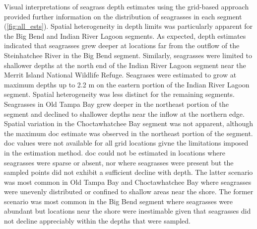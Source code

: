 \documentclass[letterpaper,12pt,oneside]{article}\usepackage[]{graphicx}\usepackage[]{color}
\begin{document}
Visual interpretations of seagrass depth estimates using the grid-based approach provided further information on the distribution of seagrasses in each segment (\cref{fig:all_ests}).  Spatial heterogeneity in depth limits was particularly apparent for the Big Bend and Indian River Lagoon segments.  As expected, depth estimates indicated that seagrasses grew deeper at locations far from the outflow of the Steinhatchee River in the Big Bend segment.  Similarly, seagrasses were limited to shallower depths at the north end of the Indian River Lagoon segment near the Merrit Island National Wildlife Refuge. Seagrases were estimated to grow at maximum depths up to 2.2 m on the eastern portion of the Indian River Lagoon segment.  Spatial heterogeneity was less distinct for the remaining segments.  Seagrasses in Old Tampa Bay grew deeper in the northeast portion of the segment and declined to shallower depths near the inflow at the northern edge.  Spatial variation in the Choctawhatchee Bay segment was not apparent, although the maximum \ac{doc} estimate was observed in the northeast portion of the segment.  \ac{doc} values were not available for all grid locations givne the limitations imposed in the estimation method.  \ac{doc} could not be estimated in locations where seagrasses were sparse or absent, nor where seagrasses were present but the sampled points did not exhibit a sufficient decline with depth.  The latter scenario was most common in Old Tampa Bay and Choctawhatchee Bay where seagrasses were unevenly distributed or confined to shallow areas near the shore.  The former scenario was most common in the Big Bend segment where seagrasses were abundant but locations near the shore were inestimable given that seagrasses did not decline appreciably within the depths that were sampled.   
\end{document}
